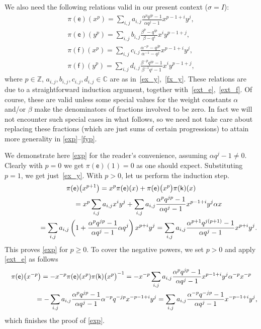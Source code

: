 \documentclass[10pt,a4paper]{amsart}
\numberwithin{equation}{section}
\begin{document}
We also need the following relations valid in our present context ($\sigma=I$):
\begin{gather}
\pi(\mathsf{e})(x^p)=\sum_{i,j}a_{i,j}\frac{\alpha^pq^{jp}-1}{\alpha q^j-1}x^{p-1+i}y^j, \label{exp}\\
\pi(\mathsf{e})(y^p)=\sum_{i,j}b_{i,j}\frac{\beta^p-q^{ip}}{\beta-q^i}x^iy^{p-1+j}, \label{eyp}\\
\pi(\mathsf{f})(x^p)=\sum_{i,j}c_{i,j}\frac{\alpha^{-p}-q^{jp}}{\alpha^{-1}-q^j}x^{p-1+i}y^j, \label{fxp}\\
\pi(\mathsf{f})(y^p)=\sum_{i,j}d_{i,j}\frac{\beta^{-p}q^{ip}-1}{\beta^{-1}q^i-1}x^iy^{p-1+j}, \label{fyp}
\end{gather}
where $p\in\mathbb{Z}$, $a_{i,j},b_{i,j},c_{i,j},d_{i,j}\in\mathbb{C}$ are as in~\eqref{ex_y},~\eqref{fx_y}. These relations are due to a straightforward induction argument, together with~\eqref{ext_e},~\eqref{ext_f}. Of course, these are valid unless some special values for the weight constants $\alpha$ and/or $\beta$ make the denominators of fractions involved to be zero. In fact we will not encounter such special cases in what follows, so we need not take care about replacing these fractions (which are just sums of certain progressions) to attain more generality in \eqref{exp}--\eqref{fyp}.

We demonstrate here \eqref{exp} for the reader's convenience, assuming $\alpha q^j-1\ne 0$. Clearly with $p=0$ we get $\pi(\mathsf{e})(1)=0$ as one should expect. Substituting $p=1$, we get just~\eqref{ex_y}. With $p>0$, let us perform the induction step.
\begin{gather*}
\pi(\mathsf{e})\big(x^{p+1}\big)= x^p\pi(\mathsf{e})(x)+\pi(\mathsf{e})\big(x^p\big)\pi(\mathsf{k})(x)\\
\hphantom{\pi(\mathsf{e})\big(x^{p+1}\big)}{} =x^p\sum_{i,j}a_{i,j}x^iy^j+\sum_{i,j}a_{i,j}\frac{\alpha^pq^{jp}-1}{\alpha q^j-1}x^{p-1+i}y^j\alpha x\\
\hphantom{\pi(\mathsf{e})\big(x^{p+1}\big)}{} =\sum_{i,j}a_{i,j}\left(1+\frac{\alpha^pq^{jp}-1}{\alpha q^j-1}\alpha q^j\right)x^{p+i}y^j=\sum_{i,j}a_{i,j}\frac{\alpha^{p+1}q^{j(p+1)}-1}{\alpha q^j-1}x^{p+i}y^j.
\end{gather*}
This proves \eqref{exp} for $p\ge 0$. To cover the negative powers, we set $p>0$ and apply \eqref{ext_e} as follows
\begin{gather*}
\pi(\mathsf{e})\big(x^{-p}\big)= -x^{-p}\pi(\mathsf{e})(x^p)\pi(\mathsf{k})\big(x^p\big)^{-1}=
-x^{-p}\sum_{i,j}a_{i,j}\frac{\alpha^pq^{jp}-1}{\alpha q^j-1}x^{p-1+i}y^j\alpha^{-p}x^{-p}\\
\hphantom{\pi(\mathsf{e})\big(x^{-p}\big)}{} =-\sum_{i,j}a_{i,j}\frac{\alpha^pq^{jp}-1}{\alpha q^j-1}\alpha^{-p}q^{-jp}x^{-p-1+i}y^j=
\sum_{i,j}a_{i,j}\frac{\alpha^{-p}q^{-jp}-1}{\alpha q^j-1}x^{-p-1+i}y^j,
\end{gather*}
which finishes the proof of \eqref{exp}.
\end{document}
